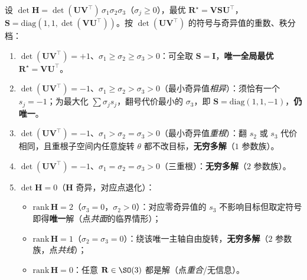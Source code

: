 \begin{theorem}\label{thm:pc-wahba-cases}
设 $\det\mathbf{H}=\det(\mathbf{U}\mathbf{V}^\top)\,\sigma_1\sigma_2\sigma_3$（$\sigma_j\ge0$），最优 $\mathbf{R}^\star=\mathbf{V}\mathbf{S}\mathbf{U}^\top$，$\mathbf{S}=\mathrm{diag}(1,1,\det(\mathbf{V}\mathbf{U}^\top))$。按 $\det(\mathbf{U}\mathbf{V}^\top)$ 的符号与奇异值的重数、秩分档：
\begin{enumerate}
  \item[\textbf{(i-a)}] $\det(\mathbf{U}\mathbf{V}^\top)=+1$、$\sigma_1\ge\sigma_2\ge\sigma_3>0$：可全取 $\mathbf{S}=\mathbf{I}$，\textbf{唯一全局最优} $\mathbf{R}^\star=\mathbf{V}\mathbf{U}^\top$。
  \item[\textbf{(i-b)}] $\det(\mathbf{U}\mathbf{V}^\top)=-1$、$\sigma_1\ge\sigma_2>\sigma_3>0$（最小奇异值\emph{相异}）：须恰有一个 $s_j=-1$；为最大化 $\sum\sigma_j s_j$，翻号代价最小的 $\sigma_3$，即 $\mathbf{S}=\mathrm{diag}(1,1,-1)$，\textbf{仍唯一}。
  \item[\textbf{(i-c)}] $\det(\mathbf{U}\mathbf{V}^\top)=-1$、$\sigma_1>\sigma_2=\sigma_3>0$（最小奇异值\emph{重根}）：翻 $s_2$ 或 $s_3$ 代价相同，且重根子空间内任意旋转 $\theta$ 都不改目标，\textbf{无穷多解}（$1$ 参数族）。
  \item[\textbf{(i-d)}] $\det(\mathbf{U}\mathbf{V}^\top)=-1$、$\sigma_1=\sigma_2=\sigma_3>0$（三重根）：\textbf{无穷多解}（$2$ 参数族）。
  \item[\textbf{(ii)}] $\det\mathbf{H}=0$（$\mathbf{H}$ 奇异，对应点退化）：
  \begin{itemize}
    \item $\mathrm{rank}\,\mathbf{H}=2$（$\sigma_3=0$，$\sigma_2>0$）：对应零奇异值的 $s_3$ 不影响目标但取定符号即得\textbf{唯一}解（点\emph{共面}的临界情形）；
    \item $\mathrm{rank}\,\mathbf{H}=1$（$\sigma_2=\sigma_3=0$）：绕该唯一主轴自由旋转，\textbf{无穷多解}（$2$ 参数族，点\emph{共线}）；
    \item $\mathrm{rank}\,\mathbf{H}=0$：任意 $\mathbf{R}\in\SO(3)$ 都是解（点\emph{重合}/无信息）。
  \end{itemize}
\end{enumerate}
\end{theorem}

